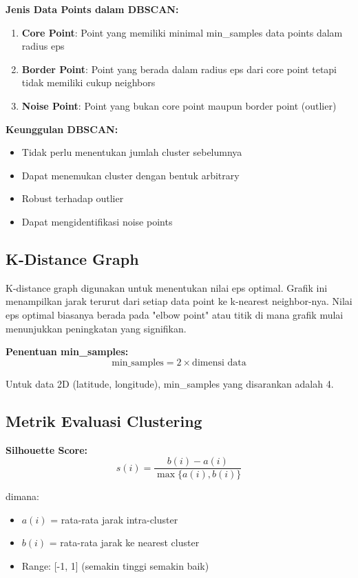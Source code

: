 \documentclass[12pt,a4paper]{article}
\begin{document}
\textbf{Jenis Data Points dalam DBSCAN:}
\begin{enumerate}
    \item \textbf{Core Point}: Point yang memiliki minimal min\_samples data points dalam radius eps
    \item \textbf{Border Point}: Point yang berada dalam radius eps dari core point tetapi tidak memiliki cukup neighbors
    \item \textbf{Noise Point}: Point yang bukan core point maupun border point (outlier)
\end{enumerate}

\textbf{Keunggulan DBSCAN:}
\begin{itemize}
    \item Tidak perlu menentukan jumlah cluster sebelumnya
    \item Dapat menemukan cluster dengan bentuk arbitrary
    \item Robust terhadap outlier
    \item Dapat mengidentifikasi noise points
\end{itemize}

\subsection{K-Distance Graph}
K-distance graph digunakan untuk menentukan nilai eps optimal. Grafik ini menampilkan jarak terurut dari setiap data point ke k-nearest neighbor-nya. Nilai eps optimal biasanya berada pada "elbow point" atau titik di mana grafik mulai menunjukkan peningkatan yang signifikan.

\textbf{Penentuan min\_samples:}
\begin{equation}
\text{min\_samples} = 2 \times \text{dimensi data}
\end{equation}

Untuk data 2D (latitude, longitude), min\_samples yang disarankan adalah 4.

\subsection{Metrik Evaluasi Clustering}

\textbf{Silhouette Score:}
\begin{equation}
s(i) = \frac{b(i) - a(i)}{\max\{a(i), b(i)\}}
\end{equation}

dimana:
\begin{itemize}
    \item $a(i)$ = rata-rata jarak intra-cluster
    \item $b(i)$ = rata-rata jarak ke nearest cluster
    \item Range: [-1, 1] (semakin tinggi semakin baik)
\end{itemize}
\end{document}
